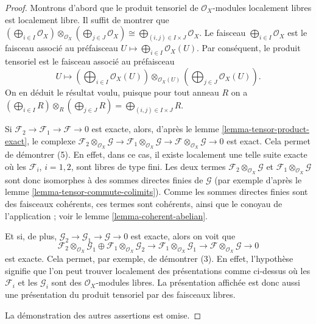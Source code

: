 \begin{proof}
Montrons d'abord que le produit tensoriel de
$\mathcal{O}_X$-modules localement libres est localement libre. Il suffit de montrer
que
$(\bigoplus_{i \in I} \mathcal{O}_X) \otimes_{\mathcal{O}_X}
(\bigoplus_{j \in J} \mathcal{O}_X) \cong
\bigoplus_{(i, j) \in I \times J} \mathcal{O}_X$.
Le faisceau $\bigoplus_{i \in I} \mathcal{O}_X$ est le faisceau associé
au préfaisceau $U \mapsto \bigoplus_{i \in I} \mathcal{O}_X(U)$.
Par conséquent, le produit tensoriel est le faisceau associé
au préfaisceau
$$
U \longmapsto
(\bigoplus\nolimits_{i \in I} \mathcal{O}_X(U))
\otimes_{\mathcal{O}_X(U)}
(\bigoplus\nolimits_{j \in J} \mathcal{O}_X(U)).
$$
On en déduit le résultat voulu, puisque pour tout anneau $R$ on a
$(\bigoplus_{i \in I} R) \otimes_R (\bigoplus_{j \in J} R) =
\bigoplus_{(i, j) \in I \times J} R$.

\medskip\noindent
Si $\mathcal{F}_2 \to \mathcal{F}_1 \to \mathcal{F} \to 0$
est exacte, alors, d'après le lemme \ref{lemma-tensor-product-exact},
le complexe
$\mathcal{F}_2 \otimes_{\mathcal{O}_X} \mathcal{G} \to
\mathcal{F}_1 \otimes_{\mathcal{O}_X} \mathcal{G} \to
\mathcal{F} \otimes_{\mathcal{O}_X} \mathcal{G} \to 0$
est exact. Cela permet de démontrer (5). En effet, dans ce cas, il existe
localement une telle suite exacte où les $\mathcal{F}_i$, $i = 1, 2$, sont
libres de type fini. Les deux termes
$\mathcal{F}_2 \otimes_{\mathcal{O}_X} \mathcal{G}$ et
$\mathcal{F}_1 \otimes_{\mathcal{O}_X} \mathcal{G}$
sont donc isomorphes à des sommes directes finies de $\mathcal{G}$ (par exemple
d'après le lemme \ref{lemma-tensor-commute-colimits}).
Comme les sommes directes finies sont des faisceaux cohérents, ces termes sont cohérents,
ainsi que le conoyau de l'application ; voir le lemme \ref{lemma-coherent-abelian}.

\medskip\noindent
Et si, de plus,
$\mathcal{G}_2 \to \mathcal{G}_1 \to \mathcal{G} \to 0$
est exacte, alors on voit que
$$
\mathcal{F}_2 \otimes_{\mathcal{O}_X} \mathcal{G}_1
\oplus
\mathcal{F}_1 \otimes_{\mathcal{O}_X} \mathcal{G}_2
\to
\mathcal{F}_1 \otimes_{\mathcal{O}_X} \mathcal{G}_1
\to
\mathcal{F} \otimes_{\mathcal{O}_X} \mathcal{G}
\to 0
$$
est exacte. Cela permet, par exemple, de démontrer (3).
En effet, l'hypothèse signifie que l'on peut trouver localement des présentations
comme ci-dessus où les $\mathcal{F}_i$ et les $\mathcal{G}_i$ sont des
$\mathcal{O}_X$-modules libres. La présentation affichée est donc aussi
une présentation du produit tensoriel par des faisceaux libres.

\medskip\noindent
La démonstration des autres assertions est omise.
\end{proof}





